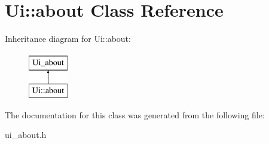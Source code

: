 \hypertarget{classUi_1_1about}{
\section{Ui::about Class Reference}
\label{classUi_1_1about}
}
Inheritance diagram for Ui::about:\begin{figure}[H]
\begin{center}
\leavevmode
\includegraphics[height=2.000000cm]{classUi_1_1about}
\end{center}
\end{figure}


The documentation for this class was generated from the following file:\begin{DoxyCompactItemize}
\item 
ui\_\-about.h\end{DoxyCompactItemize}

